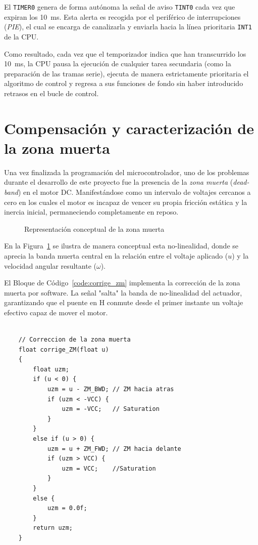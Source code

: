 \documentclass[11pt,fleqn]{book} %
\begin{document}
El \texttt{TIMER0} genera de forma autónoma la señal de aviso \texttt{TINT0} cada vez que expiran los 10~ms. Esta alerta es recogida por el periférico de interrupciones (\textit{PIE}), el cual se encarga de canalizarla y enviarla hacia la línea prioritaria \texttt{INT1} de la CPU. 

Como resultado, cada vez que el temporizador indica que han transcurrido los 10~ms, la CPU pausa la ejecución de cualquier tarea secundaria (como la preparación de las tramas serie), ejecuta de manera estrictamente prioritaria el algoritmo de control y regresa a sus funciones de fondo sin haber introducido retrasos en el bucle de control.


\newpage
\section{Compensación y caracterización de la zona muerta}
\label{cap:zona_muerta}

Una vez finalizada la programación del microcontrolador, uno de los problemas durante el desarrollo de este proyecto fue la presencia de la \textit{zona muerta} (\textit{dead-band}) en el motor DC. Manifestándose como un intervalo de voltajes cercanos a cero en los cuales el motor es incapaz de vencer su propia fricción estática y la inercia inicial, permaneciendo completamente en reposo. 

\begin{figure}[htbp]
	\centering
	\resizebox{0.55\textwidth}{!}{
	}
	\caption{Representación conceptual de la zona muerta}
	\label{fig:concepto_zona_muerta}
\end{figure}
\FloatBarrier

En la Figura~\ref{fig:concepto_zona_muerta} se ilustra de manera conceptual esta no-linealidad, donde se aprecia la banda muerta central en la relación entre el voltaje aplicado ($u$) y la velocidad angular resultante ($\omega$).

El Bloque de Código~\ref{code:corrige_zm} implementa la corrección de la zona muerta por software. La señal "salta" la banda de no-linealidad del actuador, garantizando que el puente en H conmute desde el primer instante un voltaje efectivo capaz de mover el motor. 

\begin{lstlisting}[style=estiloC, caption={Compensación de la zona muerta por código}, label={code:corrige_zm}]
	
	// Correccion de la zona muerta
	float corrige_ZM(float u)
	{
		float uzm; 
		if (u < 0) {
			uzm = u - ZM_BWD; // ZM hacia atras
			if (uzm < -VCC) {
				uzm = -VCC;   // Saturation
			} 
		}
		else if (u > 0) {
			uzm = u + ZM_FWD; // ZM hacia delante
			if (uzm > VCC) {
				uzm = VCC;    //Saturation
			} 
		}
		else {
			uzm = 0.0f;     
		}
		return uzm;
	}
\end{lstlisting}
\end{document}
